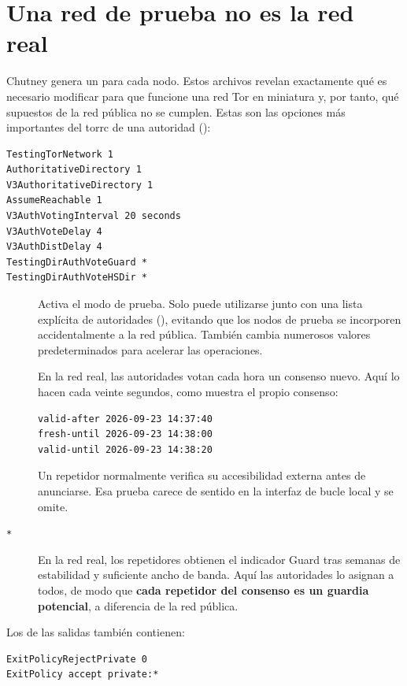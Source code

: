 \section{Una red de prueba no es la red real}\label{sec:rp-opzioni}

Chutney genera un  para cada nodo. Estos archivos revelan exactamente qué es necesario modificar para que funcione una red Tor en miniatura y, por tanto, qué supuestos de la red pública no se cumplen. Estas son las opciones más importantes del torrc de una autoridad ():
\begin{lstlisting}[language=torrc,numbers=none]
TestingTorNetwork 1
AuthoritativeDirectory 1
V3AuthoritativeDirectory 1
AssumeReachable 1
V3AuthVotingInterval 20 seconds
V3AuthVoteDelay 4
V3AuthDistDelay 4
TestingDirAuthVoteGuard *
TestingDirAuthVoteHSDir *
\end{lstlisting}

\begin{description}
  \item[] Activa el modo de prueba. Solo puede utilizarse junto con una lista explícita de autoridades (), evitando que los nodos de prueba se incorporen accidentalmente a la red pública. También cambia numerosos valores predeterminados para acelerar las operaciones.
  \item[] En la red real, las autoridades votan cada hora un consenso nuevo. Aquí lo hacen cada veinte segundos, como muestra el propio consenso:
\begin{lstlisting}[numbers=none]
valid-after 2026-09-23 14:37:40
fresh-until 2026-09-23 14:38:00
valid-until 2026-09-23 14:38:20
\end{lstlisting}
  \item[] Un repetidor normalmente verifica su accesibilidad externa antes de anunciarse. Esa prueba carece de sentido en la interfaz de bucle local y se omite.
  \item[ \texttt{*}] En la red real, los repetidores obtienen el indicador Guard tras semanas de estabilidad y suficiente ancho de banda. Aquí las autoridades lo asignan a todos, de modo que \textbf{cada repetidor del consenso es un guardia potencial}, a diferencia de la red pública.
\end{description}

Los  de las salidas también contienen:
\begin{lstlisting}[language=torrc,numbers=none]
ExitPolicyRejectPrivate 0
ExitPolicy accept private:*
\end{lstlisting}

